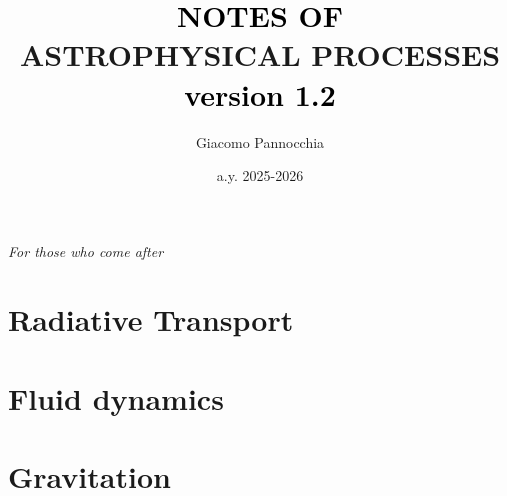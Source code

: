 \documentclass[a4paper,twoside,openright,titlepage,
               headinclude,footinclude,BCOR5mm,
               numbers=noenddot,cleardoublepage=empty,
               tablecaptionabove]{scrbook}
\author{Giacomo Pannocchia}
\title{\textcolor{black}{NOTES OF}\\ \textcolor{RawSienna}{ASTROPHYSICAL PROCESSES} \\ \vspace{7pt}\large \quad \quad \quad \quad \quad \textcolor{black}{version 1.2}}
\date{a.y. 2025-2026}
\begin{document}
  \begin{titlepage}
    \maketitle
  \end{titlepage}

\cleardoublepage
\newpage

\pagestyle{empty}

\thispagestyle{empty}
    \null{}
        \begin{flushright}
          \Large
                \emph{For those who come after}
        
        \end{flushright}
\null

\cleardoublepage
\newpage

\pagestyle{empty}
\setcounter{page}{1}

% 



\cleardoublepage
\newpage

\tableofcontents
\cleardoublepage
\newpage

\setcounter{page}{1}

\part{Radiative Transport}





\part{Fluid dynamics}



\part{Gravitation}




%

\cleardoublepage
{}


\cleardoublepage
{}
{}
\small


\end{document}

